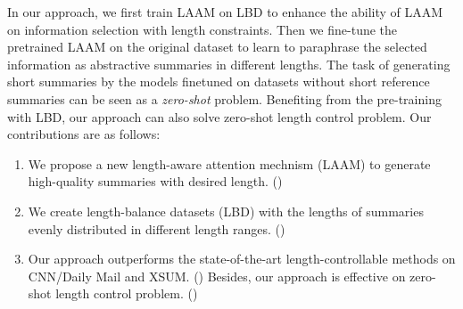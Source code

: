 In our approach, we first train LAAM on LBD to enhance the ability of LAAM on information selection with length constraints.
Then we fine-tune the pretrained LAAM on the
original dataset to learn to paraphrase
the selected information as abstractive summaries in different lengths.
The task of generating short summaries by the models finetuned on datasets without short reference summaries can be seen as a {\em zero-shot} problem.
Benefiting from the pre-training with LBD, our approach can also solve zero-shot length control problem.
Our contributions are as follows:

\begin{enumerate}
\item We propose a new length-aware attention mechnism (LAAM) to generate high-quality summaries with desired length. ()
\item We create length-balance datasets (LBD) with the lengths of summaries evenly distributed in different length ranges. ()
\item Our approach outperforms the state-of-the-art length-controllable methods 
on CNN/Daily Mail and XSUM. ()
Besides, our approach is effective on zero-shot length control problem.
()

\end{enumerate}

